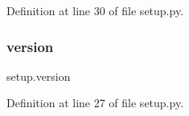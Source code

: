 Definition at line 30 of file setup.\+py.

\mbox{\label{namespacesetup_a2aa722b36a933088812b50ea79b97a5c}} 
\subsubsection{\texorpdfstring{version}{version}}
{\footnotesize\ttfamily setup.\+version}



Definition at line 27 of file setup.\+py.

